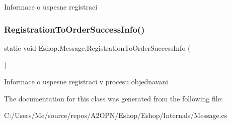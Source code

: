 Informace o uspesne registraci 

\mbox{\label{class_eshop_1_1_message_adaf1da11f78e3212111dc58cf2ac34bb}} 
\subsubsection{\texorpdfstring{RegistrationToOrderSuccessInfo()}{RegistrationToOrderSuccessInfo()}}
{\footnotesize\ttfamily static void Eshop.\+Message.\+Registration\+To\+Order\+Success\+Info (\begin{DoxyParamCaption}{ }\end{DoxyParamCaption})\hspace{0.3cm}{\ttfamily [static]}}



Informace o uspesne registraci v procesu objednavani 



The documentation for this class was generated from the following file\+:\begin{DoxyCompactItemize}
\item 
C\+:/\+Users/\+Me/source/repos/\+A2\+O\+P\+N/\+Eshop/\+Eshop/\+Internals/Message.\+cs\end{DoxyCompactItemize}
